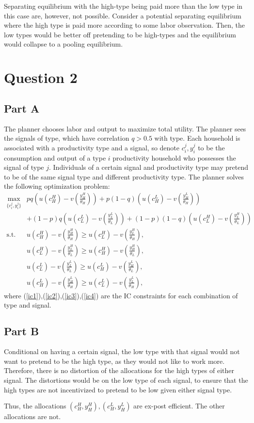 \documentclass[11pt]{article} %
\begin{document}
Separating equilibrium with the high-type being paid more than the low type in this case are, however, not possible. Consider a potential separating equilibrium where the high type is paid more according to some labor observation. Then, the low types would be better off pretending to be high-types and the equilibrium would collapse to a pooling equilibrium.

\section{Question 2}

\subsection{Part A}
The planner chooses labor and output to maximize total utility. The planner sees the signals of type, which have correlation $q>0.5$ with type. Each household is associated with a productivity type and a signal, so denote $c_i^j,y_i^j$ to be the consumption and output of a type $i$ productivity household who possesses the signal of type $j$. Individuals of a certain signal and productivity type may pretend to be of the same signal type and different productivity type. The planner solves the following optimization problem:
\begin{align}
\max_{\{c_i^j,y_i^j\}} &pq\left(u(c_H^H) - v\left( \frac{y_H^H}{\theta_H}\right)\right) + p(1-q)\left(u(c_H^L) - v\left( \frac{y_H^L}{\theta_H}\right)\right) \nonumber \\&+ (1-p)q\left(u(c_L^L) - v\left( \frac{y_L^L}{\theta_L}\right)\right) + (1-p)(1-q)\left(u(c_L^H) - v\left( \frac{y_L^H}{\theta_L}\right)\right) \nonumber \\
\text{s.t. } & u(c_H^H) - v\left( \frac{y_H^H}{\theta_H}\right) \geq u(c_L^H) - v\left( \frac{y_L^H}{\theta_H}\right), \label{ic1}\\
& u(c_L^H) - v\left( \frac{y_L^H}{\theta_L}\right) \geq u(c_H^H) - v\left( \frac{y_H^H}{\theta_L}\right), \label{ic2}\\
& u(c_L^L) - v\left( \frac{y_L^L}{\theta_L}\right) \geq u(c_H^L) - v\left( \frac{y_H^L}{\theta_L}\right), \label{ic3}\\
& u(c_H^L) - v\left( \frac{y_H^L}{\theta_H}\right) \geq u(c_L^L) - v\left( \frac{y_L^L}{\theta_H}\right), \label{ic4}
\end{align}
where (\ref{ic1}),(\ref{ic2}),(\ref{ic3}),(\ref{ic4}) are the IC constraints for each combination of type and signal.
\subsection{Part B}
Conditional on having a certain signal, the low type with that signal would not want to pretend to be the high type, as they would not like to work more. Therefore, there is no distortion of the allocations for the high types of either signal. The distortions would be on the low type of each signal, to ensure that the high types are not incentivized to pretend to be low given either signal type.

Thus, the allocations $(c_H^H,y_H^H),(c_H^L,y_H^L)$ are ex-post efficient. The other allocations are not.
\end{document}
